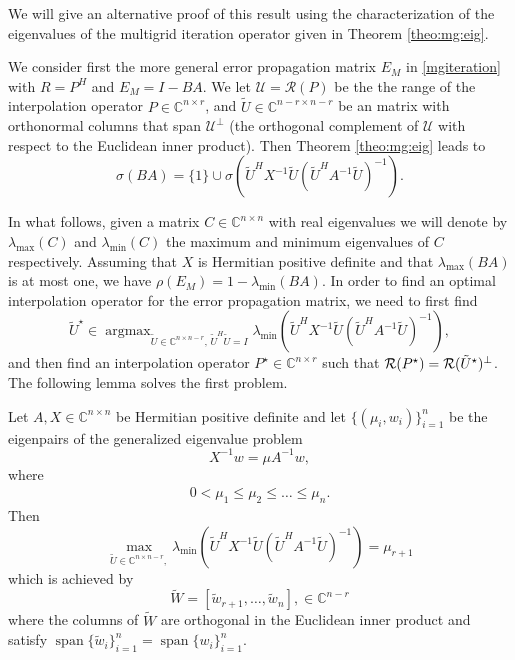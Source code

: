 \documentclass[final]{siamltex}
\newcommand{\innCnn}{\in\mathbb{C}^{n\times n}}
\newcommand{\innbCnnmr}{\in\mathbb{C}^{n\times n-r}}
\DeclareMathOperator*{\spann}{span}
\DeclareMathOperator*{\argmax}{argmax}
\newcommand{\U}{\mathcal{U}}
\newcommand{\beq}{\begin{eqnarray}}
\newcommand{\eeq}{\end{eqnarray}}
\numberwithin{equation}{section}
\newcommand{\im} {{\cal R}}
\newcommand{\C}{\mathbb{C}}
\newcommand{\Cnr}{\mathbb{C}^{n \times r}}
\newcommand{\Cnmr}{\mathbb{C}^{n-r \times n-r}}
\newcommand{\inCnn}{\in \mathbb{C}^{n \times n}}
\begin{document}
We will give an  alternative proof of this result using the
characterization
of
the
eigenvalues of the multigrid iteration operator  given in Theorem
\ref{theo:mg:eig}.  

We  consider first  the  more general error propagation matrix $E_M$ in
\eqref{mgiteration} with $R= P^H$  and  $E_{M} = I - BA$. We let $\U=
\mathcal{R}(P) $ be the
the
range of the interpolation operator
$P \in \Cnr$, and $\tilde U \in \Cnmr $ be an matrix with orthonormal columns
that span
$\U
^\perp$ (the
orthogonal complement  of $\U$ with respect to the Euclidean inner product).
Then
Theorem \ref{theo:mg:eig}  leads to
\[
\sigma (BA) = \{1\} \cup \sigma(\tilde U^HX^{-1}\tilde U (\tilde
U^HA^{-1}\tilde U)^{-1}).
\]

In what follows, given a matrix $C \inCnn$ with real eigenvalues we will denote
by
$\lambda_{\max}(C)$ and
$\lambda_{\min}(C)$
the maximum and minimum eigenvalues of $C$ respectively. Assuming that $X$ is
Hermitian positive definite and that
$\lambda_{\max}(BA)$ is at most one, we have
$\rho(E_M) = 1 - \lambda_{\min}(BA)$. In order to find an optimal interpolation
operator for the error propagation matrix,  we need  to first find
\[  \tilde{U}^\star \in \argmax_{\tilde U \innbCnnmr,\, \tilde U^H\tilde U = I}
\lambda_{\min}(\tilde
U^HX^{-1}\tilde
U
(\tilde
U^HA^{-1}\tilde U)^{-1}),
\]
and then find an interpolation operator $P^\star \in \Cnr$ such that
$\im(P^\star) =\im(\tilde U^\star)^{\perp}$. The following lemma  solves the 
first problem.

\begin{lemma} \label{theo:main}
Let $A, X \innCnn$ be Hermitian positive definite and let
$\{(\mu_i,w_i)\}_{i=1}^n$ be the eigenpairs of the generalized eigenvalue
problem
 \[X^{-1}w = \mu
A^{-1}w,\]
where
\beq
0 < \mu_1 \leq \mu_2 \leq \ldots \leq  \mu_n.
\eeq
Then
\[\max_{\tilde U \innbCnnmr, } \lambda_{\min} (\tilde
U^HX^{-1}\tilde U
(\tilde
U^HA^{-1}\tilde U)^{-1}) = \mu_{r+1}
\]
which is achieved by 
\[
\tilde W = [\tilde{w}_{r+1}, \ldots, \tilde{w}_n],
\in \C^{n-r}\] 
where the columns of $\tilde W$ are orthogonal in the Euclidean inner 
product and satisfy
$\spann\{\tilde{w}_i\}_{i=1}^n = \spann\{w_i\}_{i=1}^n$.
\end{lemma}
\end{document}
